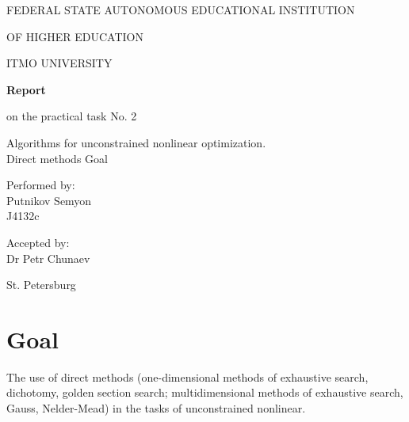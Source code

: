 \documentclass[a4paper,article,14pt]{extarticle}
\begin{document}
	\begin{titlepage}
		\begin{center}
			FEDERAL STATE AUTONOMOUS EDUCATIONAL INSTITUTION
			
			OF HIGHER EDUCATION
			
			ITMO UNIVERSITY
			\vspace{3cm}
			
			\large\textbf{Report}
			
			\large on the practical task No. 2
			
			\large \flqq Algorithms for unconstrained nonlinear optimization. \\ Direct methods Goal\frqq
			\vspace{5cm}
			

			\begin{flushright}
				{Performed by:} \\
				Putnikov Semyon \\ 
				J4132c \\
			\end{flushright}
			
			
			\begin{flushright}
				{Accepted by:} \\
				Dr Petr Chunaev \\ 
			\end{flushright}
			\vfill
			
			{St. Petersburg}
			\par{\number\year}
		\end{center}
	\end{titlepage}

	\newpage
	
	\section{Goal}
	The use of direct methods (one-dimensional methods of exhaustive search, dichotomy, golden section search; multidimensional methods of exhaustive search, Gauss, Nelder-Mead) in the tasks of unconstrained nonlinear.
	
\end{document}
